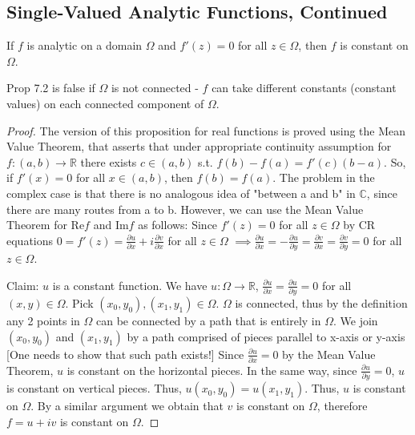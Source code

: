 \documentclass[12pt]{article}
\newcommand{\Rea}{\text{Re}}
\newcommand{\Ima}{\text{Im}}
\begin{document}
\subsection{Single-Valued Analytic Functions, Continued}

\begin{proposition}
If $f$ is analytic on a domain $\Omega$ and $f'(z) = 0$ for all $z \in \Omega$, then $f$ is constant on $\Omega$.
\end{proposition}

\begin{remark}
Prop 7.2 is false if $\Omega$ is not connected - $f$ can take different constants (constant values) on each connected component of $\Omega$.
\end{remark}

\begin{proof}
The version of this proposition for real functions is proved using the Mean Value Theorem, that asserts that under appropriate continuity assumption for $f: (a,b) \to \mathbb{R}$ there exists $c \in (a,b)$ s.t. $f(b) - f(a) = f'(c)(b-a)$. So, if $f'(x) = 0$ for all $x \in (a,b)$, then $f(b) = f(a)$. The problem in the complex case is that there is no analogous idea of "between a and b" in $\mathbb{C}$, since there are many routes from a to b.
However, we can use the Mean Value Theorem for $\Rea f$ and $\Ima f$ as follows:
Since $f'(z) = 0$ for all $z \in \Omega$ by CR equations $0 = f'(z) = \frac{\partial u}{\partial x} + i\frac{\partial v}{\partial x}$ for all $z \in \Omega$
$\implies \frac{\partial u}{\partial x} = -\frac{\partial u}{\partial y} = \frac{\partial v}{\partial x} = \frac{\partial v}{\partial y} = 0$ for all $z \in \Omega$.

Claim: $u$ is a constant function.
We have $u: \Omega \to \mathbb{R}$, $\frac{\partial u}{\partial x} = \frac{\partial u}{\partial y} = 0$ for all $(x,y) \in \Omega$.
Pick $(x_0, y_0), (x_1, y_1) \in \Omega$. $\Omega$ is connected, thus by the definition any 2 points in $\Omega$ can be connected by a path that is entirely in $\Omega$. We join $(x_0, y_0)$ and $(x_1, y_1)$ by a path comprised of pieces parallel to x-axis or y-axis [One needs to show that such path exists!] Since $\frac{\partial u}{\partial x} = 0$ by the Mean Value Theorem, $u$ is constant on the horizontal pieces. In the same way, since $\frac{\partial u}{\partial y} = 0$, $u$ is constant on vertical pieces. Thus, $u(x_0,y_0) = u(x_1,y_1)$. Thus, $u$ is constant on $\Omega$.
By a similar argument we obtain that $v$ is constant on $\Omega$, therefore $f = u+iv$ is constant on $\Omega$.
\end{proof}
\end{document}
